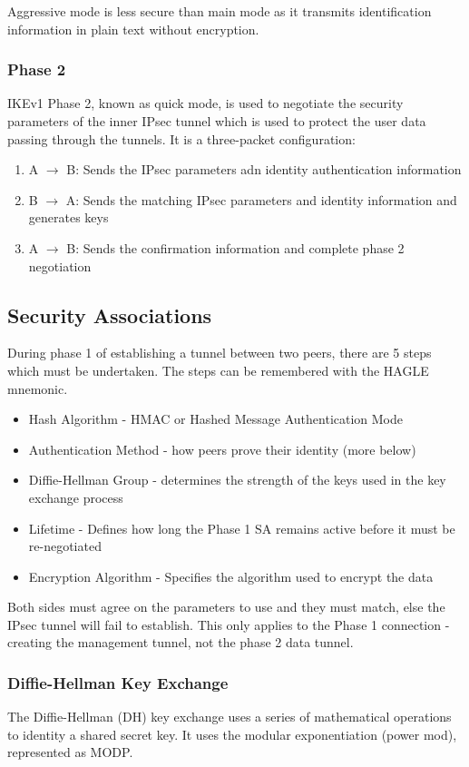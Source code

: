 Aggressive mode is less secure than main mode as it transmits identification information in plain text without encryption.

\subsubsection{Phase 2}
IKEv1 Phase 2, known as quick mode, is used to negotiate the security parameters of the inner IPsec tunnel which is used to protect the user data passing through the tunnels. It is a three-packet configuration:
\begin{enumerate}
    \item A $\rightarrow$ B: Sends the IPsec parameters adn identity authentication information
    \item B $\rightarrow$ A: Sends the matching IPsec parameters and identity information and generates keys
    \item A $\rightarrow$ B: Sends the confirmation information and complete phase 2 negotiation
\end{enumerate}

\subsection{Security Associations}
During phase 1 of establishing a tunnel between two peers, there are 5 steps which must be undertaken. The steps can be remembered with the HAGLE mnemonic.
\begin{itemize}
    \item[H] Hash Algorithm - HMAC or Hashed Message Authentication Mode
    \item[A] Authentication Method - how peers prove their identity (more below)
    \item[G] Diffie-Hellman Group - determines the strength of the keys used in the key exchange process
    \item[L] Lifetime - Defines how long the Phase 1 SA remains active before it must be re-negotiated
    \item[E] Encryption Algorithm - Specifies the algorithm used to encrypt the data 
\end{itemize}

Both sides must agree on the parameters to use and they must match, else the IPsec tunnel will fail to establish. This only applies to the Phase 1 connection - creating the management tunnel, not the phase 2 data tunnel. 

\subsubsection{Diffie-Hellman Key Exchange}
The Diffie-Hellman (DH) key exchange uses a series of mathematical operations to identity a shared secret key. It uses the modular exponentiation (power mod), represented as MODP.

